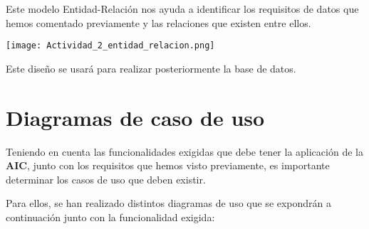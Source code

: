\documentclass{\ClassPath/viu-tfm-template}
\begin{document}
Este modelo Entidad-Relación nos ayuda a identificar los requisitos de datos que hemos comentado previamente y las relaciones que existen entre ellos.

\texttt{[image: Actividad\_2\_entidad\_relacion.png]}

Este diseño se usará para realizar posteriormente la base de datos.


\section{Diagramas de caso de uso}
Teniendo en cuenta las funcionalidades exigidas que debe tener la aplicación de la \textbf{AIC}, junto con los requisitos que hemos visto previamente, es importante determinar los casos de uso que deben existir.

Para ellos, se han realizado distintos diagramas de uso que se expondrán a continuación junto con la funcionalidad exigida:
\end{document}
